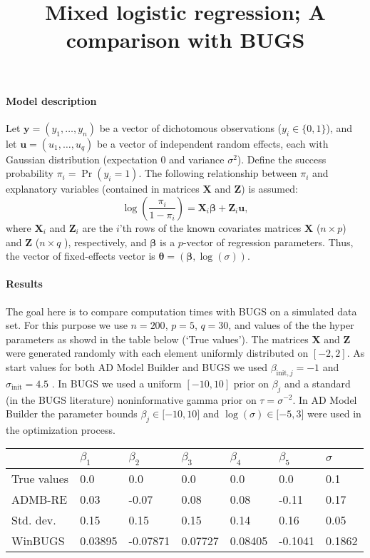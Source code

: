 \documentclass[10tp]{article}
\begin{document}
\title{Mixed logistic regression; A comparison with BUGS}
\author{}
\maketitle

\paragraph{Model description}

Let $\mathbf{y}=(y_{1},\ldots ,y_{n})$ be a vector of dichotomous
observations ($y_{i}\in \{0,1\}$), and let $\mathbf{u}=(u_{1},\ldots ,u_{q})$
be a vector of independent random effects, each with Gaussian distribution
(expectation $0$ and variance $\sigma ^{2}$). Define the success probability 
$\pi _{i}=\Pr (y_{i}=1)$. The following relationship between $\pi _{i}$ and
explanatory variables (contained in matrices $\mathbf{X}$ and $\mathbf{Z}$)
is assumed:%
\[
\log \left( \frac{\pi _{i}}{1-\pi _{i}}\right) =\mathbf{X}_{i}\mathbf{\beta }%
+\mathbf{Z}_{i}\mathbf{u}, 
\]%
where $\mathbf{X}_{i}$ and $\mathbf{Z}_{i}$ are the $i$'th rows of the known
covariates matrices $\mathbf{X}$ ($n\times p$) and $\mathbf{Z}$ ($n\times q$%
), respectively, and $\mathbf{\beta }$ is a $p$-vector of regression
parameters. Thus, the vector of fixed-effects vector is $\mathbf{\theta }=(%
\mathbf{\beta },\log \left( \sigma \right) )$.

\bigskip

\paragraph{Results}

The goal here is to compare computation times with BUGS on a simulated data
set. For this purpose we use $n=200$, $p=5$, $q=30$, and values of the the
hyper parameters as showd in the table below (`True values'). The matrices $%
\mathbf{X}$ and $\mathbf{Z}$ were generated randomly with each element
uniformly distributed on $[-2,2]$. As start values for both AD Model Builder
and BUGS we used $\beta _{\text{init},j}=-1$ and $\sigma _{\text{init}}=4.5$%
. In BUGS we used a uniform $[-10,10]$ prior on $\beta _{j}$ and a standard
(in the BUGS literature) noninformative gamma prior on $\tau =\sigma ^{-2}$.
In AD Model Builder the parameter bounds $\beta _{j}\in \lbrack -10,10]$ and 
$\log (\sigma )\in \lbrack -5,3]$ were used in the optimization process.

\begin{center}
\begin{tabular}{lllllll}
& $\beta _{1}$ & $\beta _{2}$ & $\beta _{3}$ & $\beta _{4}$ & $\beta _{5}$ & 
$\sigma $ \\ \hline
True values & 0.0 & 0.0 & 0.0 & 0.0 & 0.0 & 0.1 \\ \hline
ADMB-RE & 0.03 & -0.07 & 0.08 & 0.08 & -0.11 & 0.17 \\ 
Std. dev. & 0.15 & 0.15 & 0.15 & 0.14 & 0.16 & 0.05 \\ 
WinBUGS & 0.03895 & -0.07871 & 0.07727 & 0.08405 & -0.1041 & 0.1862%
\end{tabular}
\end{center}
\end{document}
